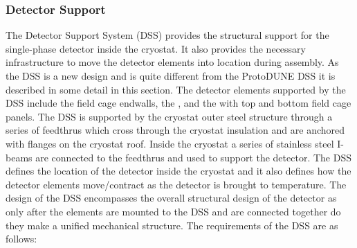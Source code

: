 \subsubsection{Detector Support}

The Detector Support System (DSS) provides the structural support for
the single-phase detector inside the cryostat.  It also provides the
necessary infrastructure to move the detector elements into location
during assembly. As the DSS is a new design and is quite different
from the ProtoDUNE DSS it is described in some detail in this
section. The detector elements supported by the DSS include the field
cage endwalls, the , and the  with top and
bottom field cage panels.  The DSS is supported by the cryostat outer
steel structure through a series of feedthrus which cross through the
cryostat insulation and are anchored with flanges on the cryostat
roof. Inside the cryostat a series of stainless steel I-beams are
connected to the feedthrus and used to support the detector. The DSS
defines the location of the detector inside the cryostat and it also
defines how the detector elements move/contract as the detector is
brought to  temperature. The design of the DSS encompasses
the overall structural design of the detector as only after the
elements are mounted to the DSS and are connected together do they
make a unified mechanical structure. The requirements of the DSS are
as follows:
%
